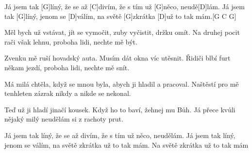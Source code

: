
Já jsem tak [G]líný, že se až [C]divím,
že s tím už [G]něco, neudě[D]lám.
Já jsem tak [G]líný, jenom se [D]válím,
na světě [G]zkrátka [D]už to tak mám.[G C G]

Měl bych už vstávat, jít se vymočit,
zuby vyčistit, držku omít.
Na druhej pocit rači však lehnu,
proboha lidi, nechte mě být.

Zvenku mě ruší hovadský auta.
Musím dát okna víc utěsnit.
Řidiči blbí furt někam jezdí,
proboha lidi, nechte mě snít.

Má milá chtěla, když se mnou byla,
abych ji hladil a pracoval.
Naštěstí pro mě tenhleten zázrak
nikdy a nikde se nekonal.

Teď už ji hladí jinačí kousek.
Když ho to baví, žehnej mu Bůh.
Já přece kvůli nějaký milý
neudělám si z rachoty prut.

Já jsem tak líný, že se až divím,
že s tím už něco, neudělám.
Já jsem tak líný, jenom se válím,
na světě zkrátka už to tak mám.
Na světě zkrátka už to tak mám